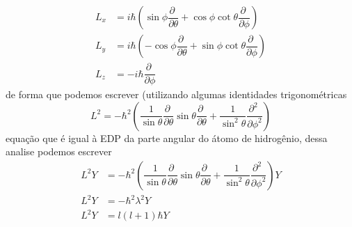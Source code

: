 \documentclass[12pt,brazil,table]{beamer}
\begin{document}
\begin{frame}
\begin{columns}[T]
    \begin{align*}
            L_x &= i\hbar \left( \sin \phi \dfrac{\partial \;}{\partial \theta} + \cos \phi \cot \theta \dfrac{\partial \;}{\partial \phi}\right)\\
            L_y &= i\hbar \left( -\cos \phi \dfrac{\partial \;}{\partial \theta} + \sin \phi \cot \theta \dfrac{\partial \;}{\partial \phi}\right)\\
            L_z &= -i\hbar\dfrac{\partial \;}{\partial \phi}
          \end{align*}
    de forma que podemos escrever (utilizando algumas identidades trigonométricas
    \[
     L^2 = -\hbar^2\left( \dfrac{1}{\sin \theta}\dfrac{\partial \;}{\partial \theta}\sin \theta \dfrac{\partial \;}{\partial \theta} + \dfrac{1}{\sin^2 \theta}\dfrac{\partial^2 \;}{\partial \phi^2}\right)
    \]
    equação que é igual à EDP da parte angular do átomo de hidrogênio, dessa analise podemos escrever
    \begin{align*}
     L^2 Y &= -\hbar^2\left( \dfrac{1}{\sin \theta}\dfrac{\partial \;}{\partial \theta}\sin \theta \dfrac{\partial \;}{\partial \theta} + \dfrac{1}{\sin^2 \theta}\dfrac{\partial^2 \;}{\partial \phi^2}\right)Y\\
     L^2 Y&=-\hbar^2 \lambda^2 Y\\
     L^2 Y&=l\left( l+1\right)\hbar Y
    \end{align*}
    
  \end{columns}
   
\end{frame}


  
\end{document}
